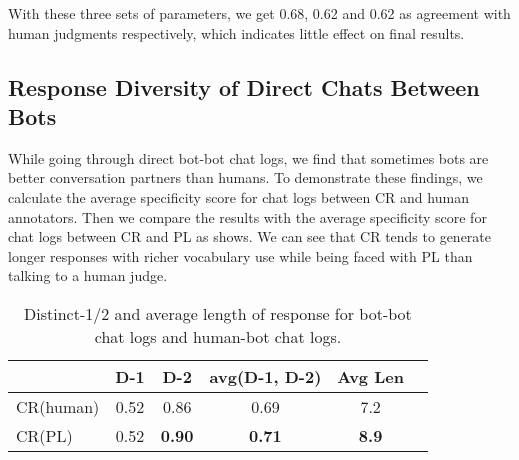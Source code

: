 With these three sets of parameters, 
we get 0.68, 0.62 and 0.62 as agreement with human judgments respectively, which indicates little effect on final results.



\subsection{Response Diversity of Direct Chats Between Bots}
\label{sec:diversity}
While going through direct bot-bot chat logs, we find that sometimes bots 
are better conversation partners than humans. 
To demonstrate these findings, 
we calculate the average specificity score for chat logs between 
CR and human annotators.  Then we compare the results with the 
average specificity score for chat logs between CR and PL as 
 shows. We can see that CR tends to generate longer 
responses with richer vocabulary use while being faced with PL than 
talking to a human judge.    

\begin{table}
\scriptsize
\centering
\begin{tabular}{lccccc}
\toprule
& D-1 & D-2 & avg(D-1, D-2)&Avg Len\\ \midrule
CR(human) & 0.52  & 0.86   &0.69  &7.2 \\ \midrule
CR(PL) & 0.52  &\textbf{ 0.90}    &\textbf{0.71} &\textbf{8.9} \\ \bottomrule
\end{tabular}
\caption{Distinct-1/2 and average length of response for bot-bot chat logs and human-bot chat logs. }
\label{tab:div}
\end{table}


